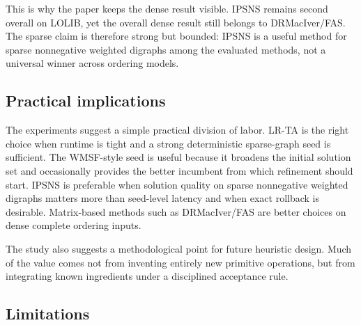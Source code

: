 This is why the paper keeps the dense result visible. IPSNS remains second overall on LOLIB, yet the overall dense result still belongs to DRMacIver/FAS. The sparse claim is therefore strong but bounded: IPSNS is a useful method for sparse nonnegative weighted digraphs among the evaluated methods, not a universal winner across ordering models.

\subsection{Practical implications}

The experiments suggest a simple practical division of labor. LR-TA is the right choice when runtime is tight and a strong deterministic sparse-graph seed is sufficient. The WMSF-style seed is useful because it broadens the initial solution set and occasionally provides the better incumbent from which refinement should start. IPSNS is preferable when solution quality on sparse nonnegative weighted digraphs matters more than seed-level latency and when exact rollback is desirable. Matrix-based methods such as DRMacIver/FAS are better choices on dense complete ordering inputs.

The study also suggests a methodological point for future heuristic design. Much of the value comes not from inventing entirely new primitive operations, but from integrating known ingredients under a disciplined acceptance rule.

\subsection{Limitations}

